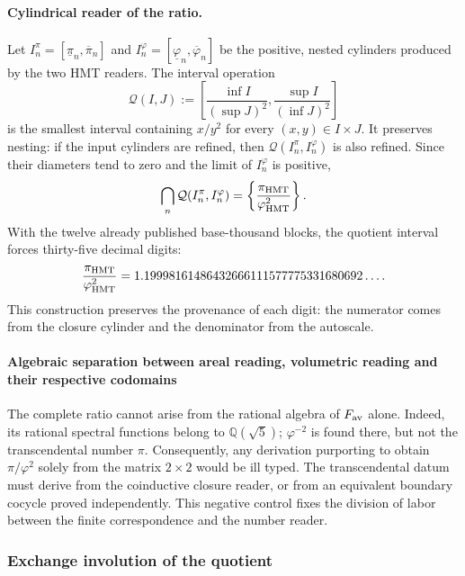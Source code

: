 \paragraph{Cylindrical reader of the ratio.}
Let \(I_n^\pi=[\underline\pi_n,\overline\pi_n]\) and
\(I_n^\varphi=[\underline\varphi_n,\overline\varphi_n]\) be the positive,
nested cylinders produced by the two HMT readers\@. The interval
operation
\[
 \mathcal Q(I,J)
 :=
 \left[
 \frac{\inf I}{(\sup J)^2},
 \frac{\sup I}{(\inf J)^2}
 \right]
\]
is the smallest interval containing \(x/y^2\) for every
\((x,y)\in I\times J\). It preserves nesting: if the input cylinders
are refined, then \(\mathcal Q(I_n^\pi,I_n^\varphi)\) is also refined. Since their
diameters tend to zero and the limit of \(I_n^\varphi\) is positive,
\[
 \bigcap_n\mathcal Q(I_n^\pi,I_n^\varphi)
 =
 \left\{\frac{\pi_{\rm HMT}}{\varphi_{\rm HMT}^2}\right\}.
\]
With the twelve already published base-thousand blocks, the quotient interval forces
thirty-five decimal digits:
\[
 \frac{\pi_{\rm HMT}}{\varphi_{\rm HMT}^2}
 =
 1.19998161486432666111577775331680692\ldots.
\]
This construction preserves the provenance of each digit: the numerator
comes from the closure cylinder and the denominator from the autoscale.

\paragraph{Algebraic separation between areal reading, volumetric reading and their respective codomains}
The complete ratio cannot arise from the rational algebra of
\(F_{\rm av}\) alone. Indeed, its rational spectral functions belong to
\(\mathbb Q(\sqrt5)\); \(\varphi^{-2}\) is found there, but not the
transcendental number \(\pi\). Consequently, any derivation purporting to
obtain \(\pi/\varphi^2\) solely from the matrix \(2\times2\) would be
ill typed. The transcendental datum must derive from the coinductive closure
reader, or from an equivalent boundary cocycle proved
independently. This negative control fixes the division of labor between
the finite correspondence and the number reader.

\subsubsection{Exchange involution of the quotient}
\label{sec:espejo-pi-phi-electron-hmt}

